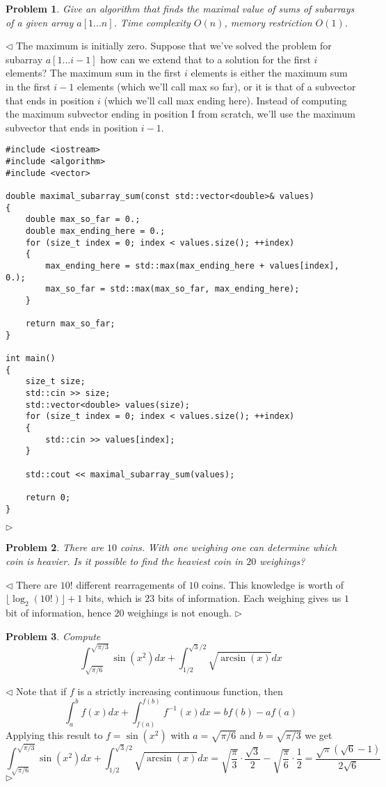 \documentclass[12pt]{article}
\newtheorem{problem}{Problem}[subsection]
\newenvironment{solution}{\par $\triangleleft$}{$\triangleright$}
\begin{document}
\begin{problem} Give an algorithm that finds the maximal value of sums of subarrays of a given array $a[1...n]$.  Time complexity $O(n)$, memory restriction $O(1)$.
\end{problem}
\begin{solution} The maximum is initially zero. Suppose that we've solved the problem
for subarray $a[1...i-1]$ how can we extend that to a solution for the first $i$ elements? The maximum sum in the first $i$ elements is either the maximum sum in the first $i-1$ elements (which we'll call max so far), or it is that of a subvector that ends in position $i$ (which we'll call 
 max ending here). Instead of computing the maximum subvector ending in position I from scratch, we'll use the maximum subvector that ends in position $i-1$.
\begin{verbatim}
#include <iostream>
#include <algorithm>
#include <vector>
 
double maximal_subarray_sum(const std::vector<double>& values)
{
    double max_so_far = 0.;
    double max_ending_here = 0.;
    for (size_t index = 0; index < values.size(); ++index)
    {
        max_ending_here = std::max(max_ending_here + values[index], 0.);
        max_so_far = std::max(max_so_far, max_ending_here);
    }
 
    return max_so_far;
}
 
int main()
{
    size_t size;
    std::cin >> size;
    std::vector<double> values(size);
    for (size_t index = 0; index < values.size(); ++index) 
    {
        std::cin >> values[index];
    }
 
    std::cout << maximal_subarray_sum(values);
 
    return 0;
}
\end{verbatim}
\end{solution}
 
\begin{problem} There are $10$ coins. With one weighing one can determine which coin is heavier. Is it possible to find the heaviest coin in $20$ weighings?
\end{problem}
\begin{solution} There are $10!$ different rearragements of $10$ coins. This knowledge is worth of $\lfloor\log_2(10!)\rfloor+1$ bits, which is $23$ bits of information. Each weighing gives us $1$ bit of information, hence $20$ weighings is not enough. 
\end{solution}
 
\begin{problem} Compute
$$
\int_{\sqrt{\pi/6}}^{\sqrt{\pi/3}}\sin(x^2)dx+\int_{1/2}^{\sqrt{3}/2}\sqrt{\arcsin(x)}dx
$$
\end{problem}
\begin{solution} Note that if $f$ is a strictly increasing continuous function, then
$$
\int_a^b f(x)dx+\int_{f(a)}^{f(b)} f^{-1}(x)dx=bf(b)-af(a)
$$
Applying this result to $f=\sin(x^2)$ with $a=\sqrt{\pi/6}$ and $b=\sqrt{\pi/3}$ we get
$$
\int_{\sqrt{\pi/6}}^{\sqrt{\pi/3}}\sin(x^2)dx+\int_{1/2}^{\sqrt{3}/2}\sqrt{\arcsin(x)}dx
=\sqrt{\frac{\pi}{3}}\cdot\frac{\sqrt{3}}{2}-\sqrt{\frac{\pi}{6}}\cdot\frac{1}{2}
=\frac{\sqrt{\pi}(\sqrt{6}-1)}{2\sqrt{6}}
$$
\end{solution}
 
\end{document}
